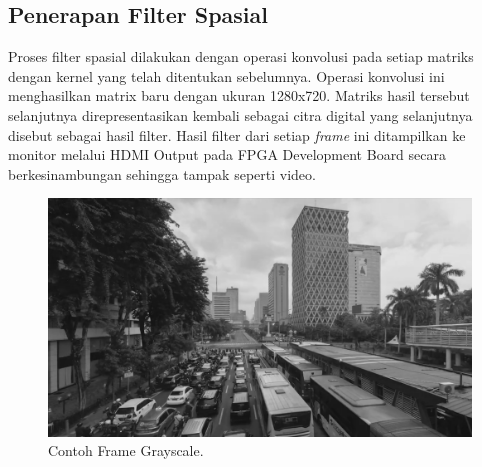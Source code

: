 

\subsection{Penerapan Filter Spasial}

Proses filter spasial dilakukan dengan operasi konvolusi pada setiap matriks dengan kernel yang telah ditentukan sebelumnya. Operasi konvolusi ini menghasilkan matrix baru dengan ukuran 1280x720. Matriks hasil tersebut selanjutnya direpresentasikan kembali sebagai citra digital yang selanjutnya disebut sebagai hasil filter. Hasil filter dari setiap \textit{frame} ini ditampilkan ke monitor melalui HDMI Output pada FPGA Development Board secara berkesinambungan sehingga tampak seperti video.

\begin{figure}[H]
    \includegraphics[width=0.8\linewidth, center]{images/output-image/input1-grayscale.png}
    \caption{Contoh Frame Grayscale.}
    \label{fig:input-grayscale}
\end{figure}

